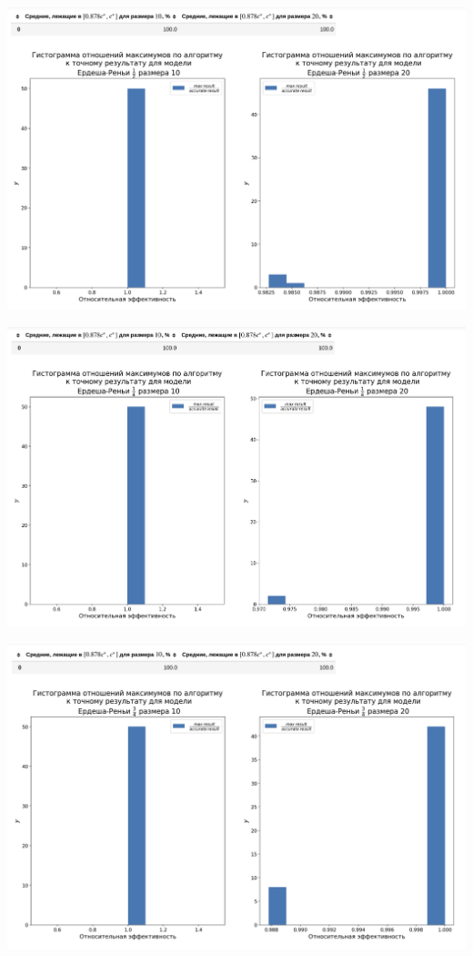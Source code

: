 \documentclass[12pt, a4paper]{article}
\begin{document}
\includegraphics[width=1\textwidth]{images/3.png}

\includegraphics[width=1\textwidth]{images/4.png}

\includegraphics[width=1\textwidth]{images/5.png}
\end{document}
